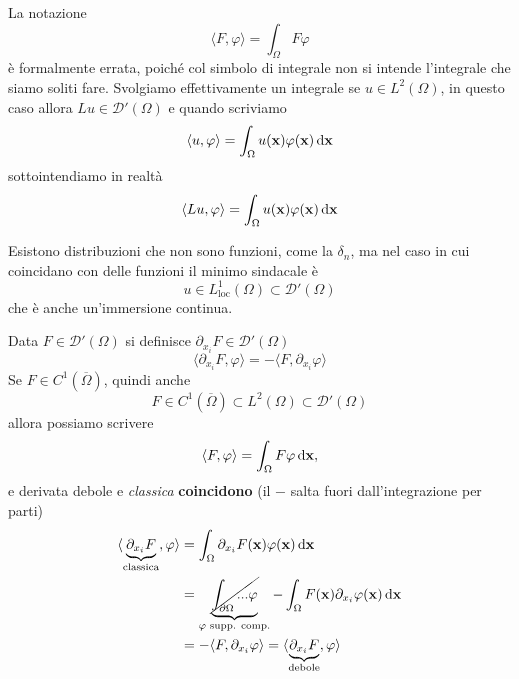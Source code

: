 \begin{nb}
    La notazione
    \begin{equation*}
        \langle F,\varphi \rangle =\int _{\Omega } F\varphi
    \end{equation*}
    è formalmente errata, poiché col simbolo di integrale non si intende l'integrale che siamo soliti fare. Svolgiamo effettivamente un integrale se $\displaystyle u\in L^{2}(\Omega)$, in questo caso allora $\displaystyle Lu\in \mathcal{D} '(\Omega)$ e quando scriviamo
    \begin{equation*}
        \langle u,\varphi \rangle =\int _{\Omega } u(\mathbf{x}) \varphi (\mathbf{x}) \,\mathrm d \mathbf{x}
    \end{equation*}
    sottointendiamo in realtà
    \begin{equation*}
        \langle Lu,\varphi \rangle =\int _{\Omega } u(\mathbf{x}) \varphi (\mathbf{x}) \,\mathrm d \mathbf{x}
    \end{equation*}
\end{nb}
Esistono distribuzioni che non sono funzioni, come la $\displaystyle \delta _{n}$, ma nel caso in cui coincidano con delle funzioni il minimo sindacale è \
\begin{equation*}
    u\in L^{1}_{\text{loc}}(\Omega) \subset \mathcal{D} '(\Omega)
\end{equation*}
che è anche un'immersione continua.
\begin{definition}
     Data $\displaystyle F\in \mathcal{D}'(\Omega)$ si definisce $\displaystyle \partial _{x_{i}} F\in \mathcal{D} '(\Omega)$
    \begin{equation*}
        \langle \partial _{x_{i}} F,\varphi \rangle =-\langle F,\partial _{x_{i}} \varphi \rangle
    \end{equation*}
    Se $\displaystyle F\in C^{1}(\overline{\Omega })$, quindi anche
    \begin{equation*}
        F\in C^{1}(\overline{\Omega }) \subset L^{2}(\Omega)\mathcal{\subset D} '(\Omega)
    \end{equation*}
    allora possiamo scrivere
    \begin{equation*}
        \langle F,\varphi \rangle =\int _{\Omega } F\varphi \,\mathrm d \mathbf{x} ,
    \end{equation*}
    e derivata debole e \textit{classica} \textbf{coincidono} (il $-$ salta fuori dall'integrazione per parti)
    \begin{align*}
        \langle \underbrace{\partial _{x_{i}} F}_{\text{classica}} ,\varphi \rangle & =\int _{\Omega } \partial _{x_{i}} F(\mathbf{x}) \varphi (\mathbf{x}) \,\mathrm d \mathbf{x}                                                                                          \\
                                                                                    & =\underbrace{\cancel{\int _{\partial \Omega } ...\varphi }}_{\varphi \text{ supp. comp.}} -\int _{\Omega } F(\mathbf{x}) \partial _{x_{i}} \varphi (\mathbf{x})\,\mathrm d \mathbf{x} \\
                                                                                    & =-\langle F,\partial _{x_{i}} \varphi\rangle =\langle \underbrace{\partial _{x_{i}} F}_{\text{debole}} ,\varphi \rangle
    \end{align*}
\end{definition}
